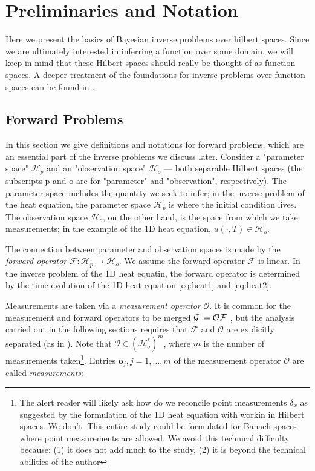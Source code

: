 \documentclass[ba]{imsart}
\newcommand{\hilp}{\mathcal{H}_p}
\newcommand{\hilo}{\mathcal{H}_o}
\newcommand{\obs}{\mathcal{O}}
\newcommand{\fwd}{\mathcal{F}}
\newcommand{\meas}{\mathbf{o}}
\theoremstyle{plain}
\theoremstyle{definition}
\theoremstyle{remark}
\begin{document}
 \section{Preliminaries and Notation}\label{section:prelim}
Here we present the basics of Bayesian inverse problems over hilbert
spaces. Since we are ultimately interested in inferring a function
over some domain, we will keep in mind that these Hilbert spaces
should really be thought of as function spaces. A deeper treatment of
the foundations for inverse problems over function spaces can be found
in \cite{Stuart10}.


\subsection{Forward Problems}\label{subsec:abstract_OED}
In this section we give definitions and notations for forward problems,
which are an essential part of the inverse problems we discuss
later. Consider a "parameter space" \(\hilp\) and an "observation
space" \(\hilo\) --- both separable Hilbert spaces (the subscripts p
and o are for "parameter" and "observation", respectively). The
parameter space includes the quantity we seek to infer; in the inverse
problem of the heat equation, the parameter space $\hilp$ is where the
initial condition lives. The observation space $\hilo$, on the other
hand, is the space from which we take measurements; in the example of
the 1D heat equation, $u(\cdot, T) \in \hilo$.

The connection between parameter and observation spaces is made by the
\emph{forward operator} \(\fwd: \hilp \to \hilo\). We assume the
forward operator \(\fwd\) is linear. In the inverse problem of the 1D
heat equatin, the forward operator is determined by the time evolution
of the 1D heat equation \eqref{eq:heat1} and \eqref{eq:heat2}.

Measurements are taken via a \emph{measurement operator} \(\obs\). It
is common for the measurement and forward operators to be merged
\(\tmp := \obs \fwd\) \cite{AlexanderianGloorGhattas14}, but the
analysis carried out in the following sections requires that \(\fwd\)
and \(\obs\) are explicitly separated (as in
\cite{attia2022stochastic, cvetkovic2023choosing}). Note that \(\obs
\in ( \hilo^* )^m\), where \(m\) is the number of measurements
taken\footnote{The alert reader will likely ask how do we reconcile
point measurements $\delta_x$ as suggested by the formulation of the
1D heat equation with workin in Hilbert spaces. We don't. This entire
study could be formulated for Banach spaces where point measurements
are allowed. We avoid this technical difficulty because: (1) it does
not add much to the study, (2) it is beyond the technical abilities of
the author}. Entries \(\meas_j, j=1,\dots,m\) of the measurement
operator \(\obs\) are called \emph{measurements}:
\end{document}

